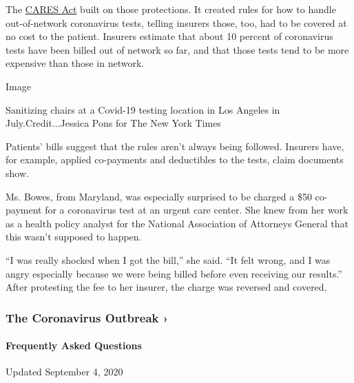 The \href{https://home.treasury.gov/policy-issues/cares}{CARES Act}
built on those protections. It created rules for how to handle
out-of-network coronavirus tests, telling insurers those, too, had to be
covered at no cost to the patient. Insurers estimate that about 10
percent of coronavirus tests have been billed out of network so far, and
that those tests tend to be more expensive than those in network.

Image

Sanitizing chairs at a Covid-19 testing location in Los Angeles in
July.Credit...Jessica Pons for The New York Times

Patients' bills suggest that the rules aren't always being followed.
Insurers have, for example, applied co-payments and deductibles to the
tests, claim documents show.

Ms. Bowes, from Maryland, was especially surprised to be charged a \$50
co-payment for a coronavirus test at an urgent care center. She knew
from her work as a health policy analyst for the National Association of
Attorneys General that this wasn't supposed to happen.

``I was really shocked when I got the bill,'' she said. ``It felt wrong,
and I was angry especially because we were being billed before even
receiving our results.'' After protesting the fee to her insurer, the
charge was reversed and covered.

\href{https://www.nytimes3xbfgragh.onion/news-event/coronavirus?action=click\&pgtype=Article\&state=default\&region=MAIN_CONTENT_3\&context=storylines_faq}{}

\hypertarget{the-coronavirus-outbreak-}{%
\subsubsection{The Coronavirus Outbreak
›}\label{the-coronavirus-outbreak-}}

\hypertarget{frequently-asked-questions}{%
\paragraph{Frequently Asked
Questions}\label{frequently-asked-questions}}

Updated September 4, 2020

